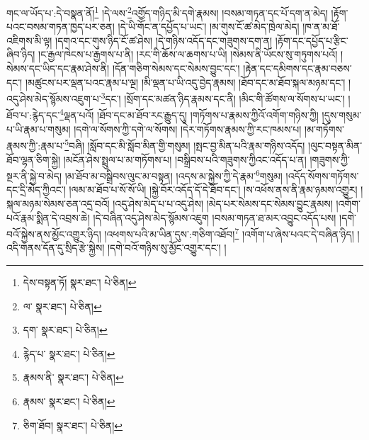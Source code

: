 གང་ལ་ཡོད་པ་:དེ་བསྣན་ནོ།\footnote{དེས་བསྟན་ཏོ།  སྣར་ཐང་།  པེ་ཅིན། } །དེ་ལས་\footnote{ལ་  སྣར་ཐང་།  པེ་ཅིན། }འགྱོད་གཉིད་མི་དགེ་རྣམས། །བསམ་གཏན་དང་པོ་དག་ན་མེད། །རྟོག་པའང་བསམ་གཏན་ཁྱད་པར་ཅན། །དེ་ཡི་གོང་ན་དཔྱོད་པ་ཡང་། །མ་གུས་ངོ་ཚ་མེད་ཁྲེལ་མེད། །ཁ་ན་མ་ཐོ་འཇིགས་མི་ལྟ། །དགའ་དང་གུས་ཉིད་ངོ་ཚ་ཤེས། །དེ་གཉིས་འདོད་དང་གཟུགས་དག་ན། །རྟོག་དང་དཔྱོད་པ་རྩིང་ཞིབ་ཉིད། །ང་རྒྱལ་ཁེངས་པ་རྒྱགས་པ་ནི། །རང་གི་ཆོས་ལ་ཆགས་པ་ཡི། །སེམས་ནི་ཡོངས་སུ་གཏུགས་པའོ། །སེམས་དང་ཡིད་དང་རྣམ་ཤེས་ནི། །དོན་གཅིག་སེམས་དང་སེམས་བྱུང་དང་། །རྟེན་དང་དམིགས་དང་རྣམ་བཅས་དང་། །མཚུངས་པར་ལྡན་པའང་རྣམ་པ་ལྔ། །མི་ལྡན་པ་ཡི་འདུ་བྱེད་རྣམས། །ཐོབ་དང་མ་ཐོབ་སྐལ་མཉམ་དང་། །འདུ་ཤེས་མེད་སྙོམས་འཇུག་པ་\footnote{དག་  སྣར་ཐང་།  པེ་ཅིན། }དང་། །སྲོག་དང་མཚན་ཉིད་རྣམས་དང་ནི། །མིང་གི་ཚོགས་ལ་སོགས་པ་ཡང་། །ཐོབ་པ་:རྙེད་དང་\footnote{རྙེད་པ་  སྣར་ཐང་།  པེ་ཅིན། }ལྡན་པའོ། །ཐོབ་དང་མ་ཐོབ་རང་རྒྱུད་དུ། །གཏོགས་པ་རྣམས་ཀྱིའོ་འགོག་གཉིས་ཀྱི། །དུས་གསུམ་པ་ཡི་རྣམ་པ་གསུམ། །དགེ་ལ་སོགས་ཀྱི་དགེ་ལ་སོགས། །དེར་གཏོགས་རྣམས་ཀྱི་རང་ཁམས་པ། །མ་གཏོགས་རྣམས་ཀྱི་:རྣམ་པ་\footnote{རྣམས་ནི་  སྣར་ཐང་།  པེ་ཅིན། }བཞི། །སློབ་དང་མི་སློབ་མིན་གྱི་གསུམ། །སྤང་བྱ་མིན་པའི་རྣམ་གཉིས་འདོད། །ལུང་བསྟན་མིན་ཐོབ་ལྷན་ཅིག་སྐྱེ། །མངོན་ཤེས་སྤྲུལ་པ་མ་གཏོགས་པ། །བསྒྲིབས་པའི་གཟུགས་ཀྱིའང་འདོད་པ་ན། །གཟུགས་ཀྱི་སྔར་ནི་སྐྱེ་བ་མེད། །མ་ཐོབ་མ་བསྒྲིབས་ལུང་མ་བསྟན། །འདས་མ་སྐྱེས་ཀྱི་དེ་རྣམ་\footnote{རྣམས་  སྣར་ཐང་།  པེ་ཅིན། }གསུམ། །འདོད་སོགས་གཏོགས་དང་དྲི་མེད་ཀྱིའང་། །ལམ་མ་ཐོབ་པ་སོ་སོ་ཡི། །སྐྱེ་བོར་འདོད་དོ་དེ་ཐོབ་དང་། །ས་འཕོས་ནས་ནི་རྣམ་ཉམས་འགྱུར། །སྐལ་མཉམ་སེམས་ཅན་འདྲ་བའོ། །འདུ་ཤེས་མེད་པ་པ་འདུ་ཤེས། །མེད་པར་སེམས་དང་སེམས་བྱུང་རྣམས། །འགོག་པའོ་རྣམ་སྨིན་དེ་འབྲས་ཆེ། །དེ་བཞིན་འདུ་ཤེས་མེད་སྙོམས་འཇུག །བསམ་གཏན་ཐ་མར་འབྱུང་འདོད་པས། །དགེ་བའོ་སྐྱེས་ནས་མྱོང་འགྱུར་ཉིད། །འཕགས་པའི་མ་ཡིན་དུས་:གཅིག་འཐོབ།\footnote{ཅིག་ཐོབ།  སྣར་ཐང་།  པེ་ཅིན། } །འགོག་པ་ཞེས་པའང་དེ་བཞིན་ཉིད། །འདི་གནས་དོན་དུ་སྲིད་རྩེ་སྐྱེས། །དགེ་བའོ་གཉིས་སུ་མྱོང་འགྱུར་དང་། །
